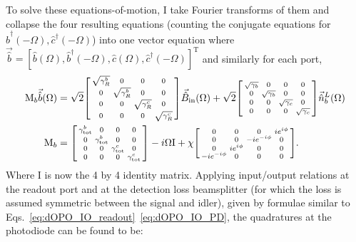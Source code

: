 To solve these equations-of-motion, I take Fourier transforms of them and collapse the four resulting equations (counting the conjugate equations for $\hat b^\dag(-\Omega), \hat c^\dag(-\Omega)$) into one vector equation where $\vec{\hat b}=[\hat b(\Omega), \hat b^\dag(-\Omega), \hat c(\Omega), \hat c^\dag(-\Omega)]^\text{T}$ and similarly for each port,
\begin{align}
\text{M}_b\vec{\hat b}(\Omega)&=\sqrt{2}\begin{bsmallmatrix}
\sqrt{\gamma^b_R} & 0 & 0 & 0 \\
0 & \sqrt{\gamma^b_R} & 0 & 0 \\
0 & 0 & \sqrt{\gamma^c_R} & 0 \\
0 & 0 & 0 & \sqrt{\gamma^c_R}
\end{bsmallmatrix}\vec{\hat B}_\mathrm{in}(\Omega) + \sqrt{2}\begin{bsmallmatrix}
\sqrt{\gamma_b} & 0 & 0 & 0 \\
0 & \sqrt{\gamma_b} & 0 & 0 \\
0 & 0 & \sqrt{\gamma_c} & 0 \\
0 & 0 & 0 & \sqrt{\gamma_c}
\end{bsmallmatrix}\vec{\hat n}^L_b(\Omega)\\
\text{M}_b&=\begin{bsmallmatrix}
\gamma^b_\mathrm{tot} & 0 & 0 & 0 \\
0 & \gamma^b_\mathrm{tot} & 0 & 0 \\
0 & 0 & \gamma^c_\mathrm{tot} & 0 \\
0 & 0 & 0 & \gamma^c_\mathrm{tot} 
\end{bsmallmatrix}-i\Omega \text{I}+\chi \begin{bsmallmatrix}
0 & 0 & 0 & i e^{i\phi} \\
0 & 0 & -i e^{-i\phi} & 0 \\
0 & i e^{i\phi} & 0 & 0 \\
-i e^{-i\phi} & 0 & 0 & 0
\end{bsmallmatrix}.
\end{align}
Where $\text{I}$ is now the 4 by 4 identity matrix. Applying input/output relations at the readout port and at the detection loss beamsplitter (for which the loss is assumed symmetric between the signal and idler), given by formulae similar to Eqs.~\ref{eq:dOPO_IO_readout}~\ref{eq:dOPO_IO_PD}, the quadratures at the photodiode can be found to be:
